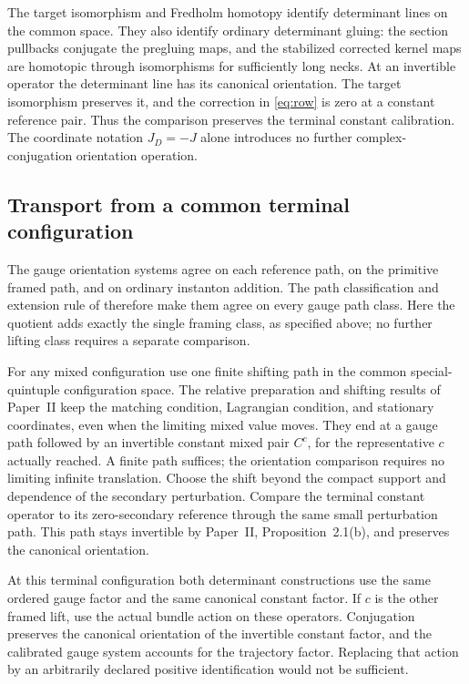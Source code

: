 \documentclass[11pt]{amsart}
\theoremstyle{definition}
\theoremstyle{remark}
\theoremstyle{plain}
\begin{document}
The target isomorphism and Fredholm homotopy identify determinant
lines on the common space. They also identify ordinary determinant
gluing: the section pullbacks conjugate the pregluing maps, and
the stabilized corrected kernel maps are homotopic through
isomorphisms for sufficiently long necks. At an invertible
operator the determinant line has its canonical orientation.
The target isomorphism preserves it, and the correction in
\eqref{eq:row} is zero at a constant reference pair. Thus the
comparison preserves the terminal constant calibration. The
coordinate notation $J_D=-J$ alone introduces no further
complex-conjugation orientation operation.

\subsection{Transport from a common terminal configuration}
\label{subsec:terminal-transport}
The gauge orientation systems agree on each reference path, on
the primitive framed path, and on ordinary instanton addition.
The path classification and extension rule of
\cite[Section~2.4, the classification preceding (2.48) and the
gluing map (2.55)]{DFL} therefore make them agree
on every gauge path class. Here the quotient adds exactly the
single framing class, as specified above; no further lifting
class requires a separate comparison.

For any mixed configuration use one finite shifting path in the
common special-quintuple configuration space. The relative
preparation and shifting results of Paper~II keep the matching
condition, Lagrangian condition, and stationary coordinates, even
when the limiting mixed value moves. They end at a gauge path
followed by an invertible constant mixed pair $C^c$, for the
representative $c$ actually reached. A finite path suffices; the
orientation comparison requires no limiting infinite translation.
Choose the shift beyond the compact support and dependence of
the secondary perturbation. Compare the terminal constant
operator to its zero-secondary reference through the same small
perturbation path. This path stays invertible by Paper~II,
Proposition~2.1(b), and preserves the canonical orientation.

At this terminal configuration both determinant constructions
use the same ordered gauge factor and the same canonical constant
factor. If $c$ is the other framed lift, use the actual bundle
action on these operators. Conjugation preserves the canonical
orientation of the invertible constant factor, and the calibrated
gauge system accounts for the trajectory factor. Replacing that
action by an arbitrarily declared positive identification would
not be sufficient.
\end{document}
